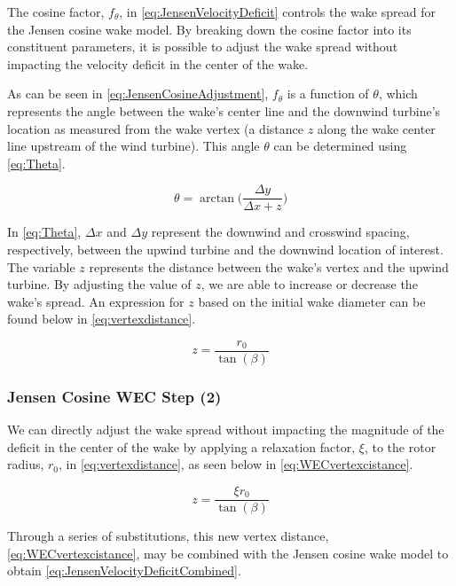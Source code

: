 \documentclass{jpconf}
\begin{document}
The cosine factor, $f_\theta$, in \cref{eq:JensenVelocityDeficit} controls the wake spread for the Jensen cosine wake model. By breaking down the cosine factor into its constituent parameters, it is possible to adjust the wake spread without impacting the velocity deficit in the center of the wake.

As can be seen in \cref{eq:JensenCosineAdjustment}, $f_\theta$ is a function of $\theta$, which represents the angle between the wake's center line and the downwind turbine's location as measured from the wake vertex (a distance $z$ along the wake center line upstream of the wind turbine). This angle $\theta$ can be determined using \cref{eq:Theta}.

\begin{equation}
	\theta = \arctan\Big( \frac{\Delta y}{\Delta x + z} \Big)
	\label{eq:Theta}
\end{equation}

In \cref{eq:Theta}, $\Delta x$ and $\Delta y$ represent the downwind and crosswind spacing, respectively, between the upwind turbine and the downwind location of interest. The variable $z$ represents the distance between the wake's vertex and the upwind turbine. By adjusting the value of $z$, we are able to increase or decrease the wake's spread. An expression for $z$ based on the initial wake diameter can be found below in \cref{eq:vertexdistance}.

\begin{equation}
	z = \frac{r_0}{\tan(\beta)}
	\label{eq:vertexdistance}
\end{equation} 


\subsubsection{Jensen Cosine WEC Step (2)}
We can directly adjust the wake spread without impacting the magnitude of the deficit in the center of the wake by applying a relaxation factor, $\xi$, to the rotor radius, $r_0$, in \cref{eq:vertexdistance}, as seen below in \cref{eq:WECvertexcistance}.

\begin{equation}
	z = \frac{\xi r_0}{\tan(\beta)}
	\label{eq:WECvertexcistance}
\end{equation}

Through a series of substitutions, this new vertex distance, \cref{eq:WECvertexcistance}, may be combined with the Jensen cosine wake model to obtain \cref{eq:JensenVelocityDeficitCombined}.
\end{document}
